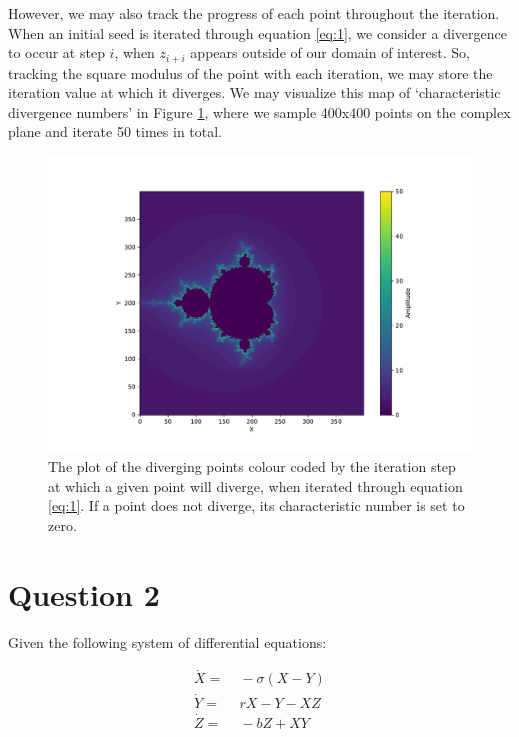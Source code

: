 \documentclass[10pt, letterpaper]{article}
\begin{document}
However, we may also track the progress of each point throughout the iteration. When an initial seed is iterated through equation \ref{eq:1}, we consider a divergence to occur at step $i$, when $z_{i+i}$ appears outside of our domain of interest. So, tracking the square modulus of the point with each iteration, we may store the iteration value at which it diverges. We may visualize this map of `characteristic divergence numbers' in Figure \ref{fig:m2}, where we sample 400x400 points on the complex plane and iterate 50 times in total.

\begin{figure}[H]
    \hspace*{-5mm}
        \centering
        \includegraphics[width =\textwidth]{mandel2.pdf}
        \caption{The plot of the diverging points colour coded by the iteration step at which a given point will diverge, when iterated through equation \ref{eq:1}. If a point does not diverge, its characteristic number is set to zero.}
        \label{fig:m2}
\end{figure}

\section{Question 2}

Given the following system of differential equations:

\begin{align}
    \dot{X} =& \; -\sigma \left( X - Y \right) \label{eq:2}\\[2mm]
    \dot{Y} =&\; rX - Y - XZ \label{eq:3}\\[2mm]
    \dot{Z} =&\; -bZ + XY \label{eq:4}
\end{align}
\end{document}
